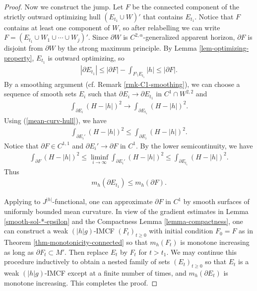 \documentclass[11pt, letterpaper]{amsart}
\theoremstyle{definition}
\theoremstyle{remark}
\begin{document}
\begin{proof}
	Now we construct the jump. Let $F$ be the connected component of the strictly outward optimizing hull $(E_{t_1} \cup W)'$ that contains $E_{t_1}$. Notice that $F$ contains at least one component of $W$, so after relabelling we can write $F= (E_{t_1} \cup W_1 \cup \cdots \cup W_j)'$. Since $\partial W$ is $C^{2,\alpha }$-generalized apparent horizon, $\partial F$ is disjoint from $\partial W$ by the strong maximum principle. By Lemma \ref{lem-optimizing-property}, $E_{t_1}$ is outward optimizing, so 
	\begin{align*}
		|\partial E_{t_1}| \leq |\partial F| - \int_{F \setminus E_{t_1}}|h| \leq |\partial F|.
	\end{align*} 
	By a smoothing argument (cf. Remark \ref{rmk-C1-smoothing}), we can choose a sequence of smooth sets $E_i$ such that $\partial E_i \to \partial E_{t_1}$ in $C^1 \cap W ^{2,2}$ and 
\begin{align*}
	\int_{\partial E_i} (H - |h|)^2 \to \int_{\partial E_{t_1}} (H- |h|)^2.
\end{align*} 
Using (\ref{mean-curv-hull}), we have
\begin{align*}
	\int_{\partial E_i'} (H- |h|)^2 \leq \int_{\partial E_i}(H-|h|)^2.
\end{align*} 
Notice that $\partial F \in C^{1, 1}$ and $\partial E_i' \to \partial F$ in $C^1$. By the lower semicontinuity, we have
\begin{align*}
	\int_{\partial F} (H-|h|)^2 \leq \liminf_{i\to \infty} \int_{\partial E_i'} (H-|h|)^2 \leq \int_{\partial E_{t_1}}(H-|h|)^2.  
\end{align*} 
Thus
\begin{align*}
	m_{h}(\partial E_{t_1}) \leq m_{h}(\partial F).
\end{align*} 

Applying \cite[Lemma 6.2]{HI01} to $J^{|h|}$-functional, one can approximate $\partial F$ in $C^1$ by smooth surfaces of uniformly bounded mean curvature. In view of the gradient estimates in Lemma \ref{smooth-sol-*-epsilon} and the Compactness Lemma \ref{lemma-compactness}, one can construct a weak $(|h|g)$-IMCF $(F_{t})_{t \geq 0}$ with initial condition $F_0= F$ as in Theorem \ref{thm-monotonicity-connected} so that $m_{h}(F_t)$ is monotone increasing as long as $\partial F_t \subset M'$. Then replace $E_{t}$ by $F_{t}$ for $t > t_1$. We may continue this procedure inductively to obtain a nested family of sets
 $(E_t)_{t \geq 0}$ so that $E_t$ is a weak $(|h|g)$-IMCF except at a finite number of times, and $m_{h}(\partial E_t)$ is monotone increasing. This completes the proof.
\end{proof}
\end{document}
